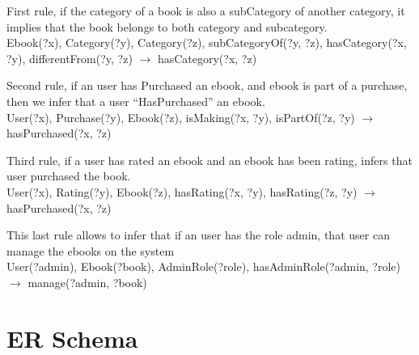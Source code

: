 \documentclass[a4paper,11pt]{article}
\begin{document}
First rule, if the category of a book is also a subCategory of another category, it implies that the book belongs to both category and subcategory.\\
Ebook(?x), Category(?y), Category(?z), subCategoryOf(?y, ?z), hasCategory(?x, ?y), differentFrom(?y, ?z) $\rightarrow$ hasCategory(?x, ?z)

Second rule, if an user has Purchased an ebook, and ebook is part of a purchase, then we infer that a user “HasPurchased” an ebook. \\
User(?x), Purchase(?y), Ebook(?z), isMaking(?x, ?y), isPartOf(?z, ?y) $\rightarrow$ hasPurchased(?x, ?z)

Third rule, if a user has rated an ebook and an ebook has been rating, infers that user purchased the book.\\
User(?x), Rating(?y), Ebook(?z), hasRating(?x, ?y), hasRating(?z, ?y) $\rightarrow$ hasPurchased(?x, ?z)

This last rule allows to infer that if an user has the role admin, that user can manage the ebooks on the system\\
User(?admin), Ebook(?book), AdminRole(?role), hasAdminRole(?admin, ?role) $\rightarrow$ manage(?admin, ?book)

\section{ER Schema}

\begin{center}
\end{center}
\end{document}
